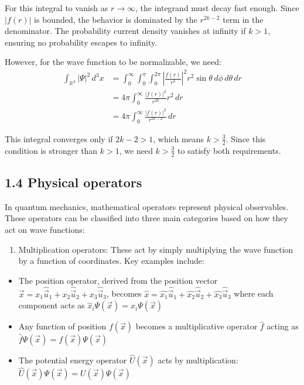 \documentclass[italian]{HKNdocument}
\begin{document}
For this integral to vanish as $r \to \infty$, the integrand must decay fast enough. Since $|f(r)|$ is bounded, the behavior is dominated by the $r^{2k-2}$ term in the denominator. The probability current density vanishes at infinity if $k > 1$, ensuring no probability escapes to infinity.

However, for the wave function to be normalizable, we need:
\begin{align*}
\int_{\mathbb{R}^{3}} |\Psi|^2 \, d^3x &= \int_0^\infty \int_0^\pi \int_0^{2\pi} \left|\frac{f(r)}{r^k}\right|^2 r^2 \sin\theta \, d\phi \, d\theta \, dr \\
&= 4\pi \int_0^\infty \frac{|f(r)|^2}{r^{2k}} r^2 \, dr \\
&= 4\pi \int_0^\infty \frac{|f(r)|^2}{r^{2k-2}} \, dr
\end{align*}

This integral converges only if $2k-2 > 1$, which means $k > \frac{3}{2}$. Since this condition is stronger than $k > 1$, we need $k > \frac{3}{2}$ to satisfy both requirements.

\subsection*{1.4 Physical operators}
In quantum mechanics, mathematical operators represent physical observables. These operators can be classified into three main categories based on how they act on wave functions:

\begin{enumerate}
  \item Multiplication operators: These act by simply multiplying the wave function by a function of coordinates. Key examples include:
\end{enumerate}

\begin{itemize}
  \item The position operator, derived from the position vector $\vec{x}=x_{1} \hat{\vec{u}}_{1}+x_{2} \hat{\vec{u}}_{2}+x_{3} \hat{\vec{u}}_{3}$, becomes $\hat{x}=\hat{x_{1}} \hat{\vec{u}}_{1}+\hat{x_{2}} \hat{\vec{u}}_{2}+\hat{x_{3}} \hat{\vec{u}}_{3}$ where each component acts as $\hat{x}_i\Psi(\vec{x}) = x_i\Psi(\vec{x})$
  \item Any function of position $f(\vec{x})$ becomes a multiplicative operator $\hat{f}$ acting as $\hat{f}\Psi(\vec{x}) = f(\vec{x})\Psi(\vec{x})$
  \item The potential energy operator $\hat{U}(\vec{x})$ acts by multiplication: $\hat{U}(\vec{x})\Psi(\vec{x}) = U(\vec{x})\Psi(\vec{x})$
\end{itemize}
\end{document}
